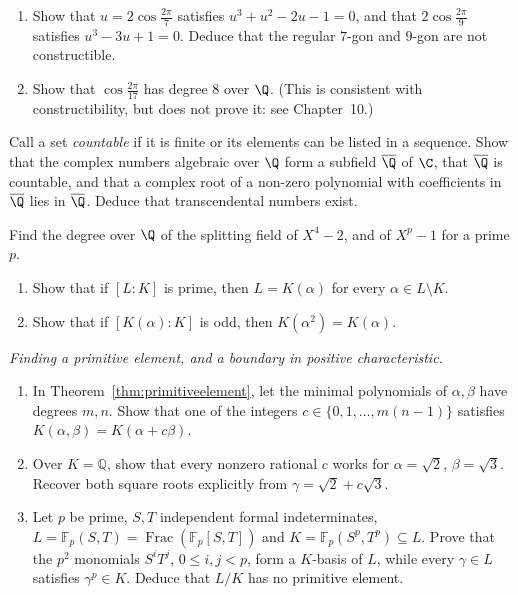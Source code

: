\begin{exercise}[$\star\star$]\label{ex:polygons}
\begin{enumerate}[label=(\alph*)]
\item Show that $u=2\cos\frac{2\pi}7$ satisfies $u^3+u^2-2u-1=0$, and that $2\cos\frac{2\pi}9$ satisfies $u^3-3u+1=0$. Deduce that the regular $7$-gon and $9$-gon are not constructible.
\item Show that $\cos\frac{2\pi}{17}$ has degree $8$ over $\Q$. (This is consistent with constructibility, but does not prove it: see Chapter~10.)
\end{enumerate}
\end{exercise}

\begin{exercise}[$\star\star$]\label{ex:algfield}
Call a set \emph{countable} if it is finite or its elements can be listed
in a sequence. Show that the complex numbers algebraic over $\Q$ form a subfield $\overline{\Q}$ of $\C$, that $\overline{\Q}$ is countable, and that a complex root of a non-zero polynomial with coefficients in $\overline{\Q}$ lies in $\overline{\Q}$. Deduce that transcendental numbers exist.
\end{exercise}

\begin{exercise}[$\star\star$]\label{ex:splitdeg}
Find the degree over $\Q$ of the splitting field of $X^4-2$, and of $X^p-1$ for a prime $p$.
\end{exercise}

\begin{exercise}[$\star\star$]\label{ex:oddeg}
\begin{enumerate}[label=(\alph*)]
\item Show that if $[L:K]$ is prime, then $L=K(\alpha)$ for every $\alpha\in L\setminus K$.
\item Show that if $[K(\alpha):K]$ is odd, then $K(\alpha^2)=K(\alpha)$.
\end{enumerate}
\end{exercise}

\begin{exercise}[$\star\star\star$]\label{ex:primitive}
\emph{Finding a primitive element, and a boundary in positive characteristic.}
\begin{enumerate}[label=(\alph*)]
\item In Theorem~\ref{thm:primitiveelement}, let the minimal polynomials of
$\alpha,\beta$ have degrees $m,n$. Show that one of the integers
$c\in\{0,1,\ldots,m(n-1)\}$ satisfies $K(\alpha,\beta)=K(\alpha+c\beta)$.
\item Over $K=\mathbb Q$, show that every nonzero rational $c$ works for
$\alpha=\sqrt2$, $\beta=\sqrt3$. Recover both square roots explicitly from
$\gamma=\sqrt2+c\sqrt3$.
\item Let $p$ be prime, $S,T$ independent formal indeterminates,
$L=\mathbb F_p(S,T)=\operatorname{Frac}(\mathbb F_p[S,T])$ and
$K=\mathbb F_p(S^p,T^p)\subseteq L$. Prove that the $p^2$ monomials
$S^iT^j$, $0\le i,j<p$, form a $K$-basis of $L$, while every
$\gamma\in L$ satisfies $\gamma^p\in K$. Deduce that $L/K$ has no
primitive element.
\end{enumerate}
\end{exercise}

